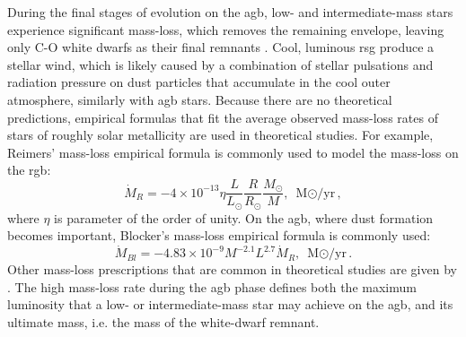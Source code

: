During the final stages of evolution on the \ac{agb}, low- and intermediate-mass stars experience significant mass-loss, which removes the remaining envelope, leaving only C-O white dwarfs as their final remnants \citep{marigo2007evolution, pols2011stellar}. Cool, luminous \ac{rsg} produce a stellar wind, which is likely caused by a combination of stellar pulsations and radiation pressure on dust particles that accumulate in the cool outer atmosphere, similarly with \ac{agb} stars. Because there are no theoretical predictions, empirical formulas that fit the average observed mass-loss rates of stars of roughly solar metallicity are used in theoretical studies. For example, Reimers' mass-loss empirical formula \citep{reimers1975circumstellar} is commonly used to model the mass-loss on the \ac{rgb}:
\begin{equation}\label{eq:reimer}
    \dot{M}_{R} = -4 \times 10^{-13} \eta 
    \frac{L}{L_{\odot}}  \frac{R}{R_{\odot}} \frac{M_{\odot}}{M},
    \text{ M${\odot}$/yr},
\end{equation}
where $\eta$ is parameter of the order of unity. On the \ac{agb}, where dust formation becomes important, Blocker's mass-loss empirical formula \citep{bloecker1995stellarI,bloecker1995stellarII} is commonly used:
\begin{equation}\label{eq:blocker}
    \dot{M}_{Bl} = -4.83 \times 10^{-9} M^{-2.1} L^{2.7} \dot{M}_{R},
    \text{ M${\odot}$/yr}.
\end{equation}
Other mass-loss prescriptions that are common in theoretical studies are given by \cite{de1988mass,nieuwenhuijzen1990parametrization}. The high mass-loss rate during the \ac{agb} phase defines both the maximum luminosity that a low- or intermediate-mass star may achieve on the \ac{agb}, and its ultimate mass, i.e. the mass of the white-dwarf remnant.

